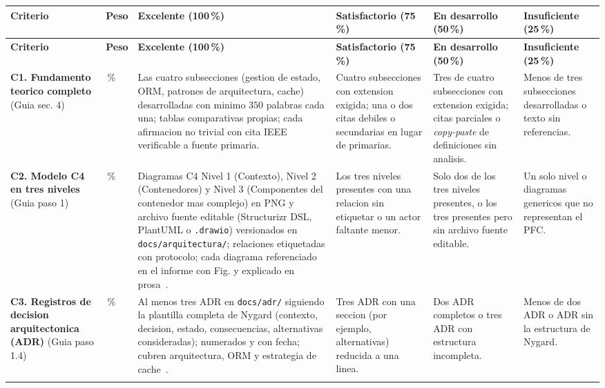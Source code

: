 \documentclass[11pt,a4paper]{article}
\begin{document}
{
\footnotesize
\renewcommand{\arraystretch}{1.3}
\begin{longtable}{|L{3.0cm}|C{0.9cm}|L{2.5cm}|L{2.5cm}|L{2.5cm}|L{2.3cm}|}
\hline
{}
{\color{white}\textbf{Criterio}} &
{\color{white}\textbf{Peso}} &
{\color{white}\textbf{Excelente (100\,\%)}} &
{\color{white}\textbf{Satisfactorio (75\,\%)}} &
{\color{white}\textbf{En desarrollo (50\,\%)}} &
{\color{white}\textbf{Insuficiente (25\,\%)}} \\
\hline
\endfirsthead

\hline
{}
{\color{white}\textbf{Criterio}} &
{\color{white}\textbf{Peso}} &
{\color{white}\textbf{Excelente (100\,\%)}} &
{\color{white}\textbf{Satisfactorio (75\,\%)}} &
{\color{white}\textbf{En desarrollo (50\,\%)}} &
{\color{white}\textbf{Insuficiente (25\,\%)}} \\
\hline
\endhead

\textbf{C1. Fundamento teorico completo} (Guia sec. 4) &
\,\% &
Las cuatro subsecciones (gestion de estado, ORM, patrones de arquitectura, cache) desarrolladas con minimo $350$ palabras cada una; tablas comparativas propias; cada afirmacion no trivial con cita IEEE verificable a fuente primaria. &
Cuatro subsecciones con extension exigida; una o dos citas debiles o secundarias en lugar de primarias. &
Tres de cuatro subsecciones con extension exigida; citas parciales o \emph{copy-paste} de definiciones sin analisis. &
Menos de tres subsecciones desarrolladas o texto sin referencias. \\

\textbf{C2. Modelo C4 en tres niveles} (Guia paso 1) &
\,\% &
Diagramas C4 Nivel 1 (Contexto), Nivel 2 (Contenedores) y Nivel 3 (Componentes del contenedor mas complejo) en PNG y archivo fuente editable (Structurizr DSL, PlantUML o \texttt{.drawio}) versionados en \texttt{docs/arquitectura/}; relaciones etiquetadas con protocolo; cada diagrama referenciado en el informe con Fig. y explicado en prosa~\cite{brown2023c4}. &
Los tres niveles presentes con una relacion sin etiquetar o un actor faltante menor. &
Solo dos de los tres niveles presentes, o los tres presentes pero sin archivo fuente editable. &
Un solo nivel o diagramas genericos que no representan el PFC. \\

\textbf{C3. Registros de decision arquitectonica (ADR)} (Guia paso 1.4) &
\,\% &
Al menos tres ADR en \texttt{docs/adr/} siguiendo la plantilla completa de Nygard (contexto, decision, estado, consecuencias, alternativas consideradas); numerados y con fecha; cubren arquitectura, ORM y estrategia de cache~\cite{nygard2011adr}. &
Tres ADR con una seccion (por ejemplo, alternativas) reducida a una linea. &
Dos ADR completos o tres ADR con estructura incompleta. &
Menos de dos ADR o ADR sin la estructura de Nygard. \\


\end{longtable}}
\end{document}
